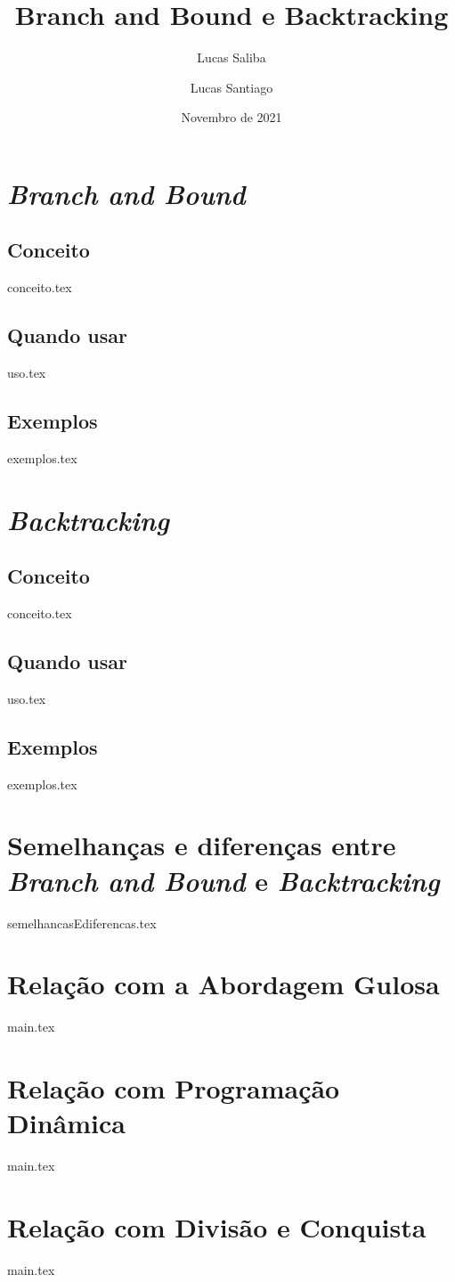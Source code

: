 \documentclass{article}
\title{Branch and Bound e Backtracking}
\author{Lucas Saliba \and Lucas Santiago}
\date{Novembro de 2021}
\begin{document}
\maketitle

\section{\emph{Branch and Bound}}
\subsection{Conceito}
{conceito.tex}

\subsection{Quando usar}
{uso.tex}

\subsection{Exemplos}
{exemplos.tex}


\section{\emph{Backtracking}}
\subsection{Conceito}
{conceito.tex}

\subsection{Quando usar}
{uso.tex}

\subsection{Exemplos}
{exemplos.tex}

\section{Semelhanças e diferenças entre \emph{Branch and Bound} e \emph{Backtracking}}
{semelhancasEdiferencas.tex}

\section{Relação com a Abordagem Gulosa}
{main.tex}

\section{Relação com Programação Dinâmica}
{main.tex}

\section{Relação com Divisão e Conquista}
{main.tex}
\end{document}
